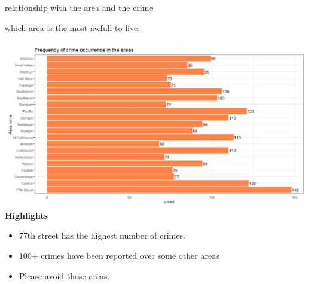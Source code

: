\documentclass{beamer}\usepackage[]{graphicx}\usepackage[]{xcolor}
\makeatletter
\def\maxwidth{ %
  \ifdim\Gin@nat@width>\linewidth
    \linewidth
  \else
    \Gin@nat@width
  \fi
}
\newenvironment{knitrout}{}{} %
\makeatother
\begin{document}
\begin{frame}[fragile]{relationship with the area and the crime}

which area is the most awfull to live.

\begin{knitrout}
\color{fgcolor}
\includegraphics[width=\maxwidth]{figure/place.png} 
\end{knitrout}
\textbf{Highlights}
\begin{itemize}
\item 77th street has the highest number of crimes.
\item 100+ crimes have been reported over some other areas
\item Please avoid those areas.

\end{itemize}
\end{frame}
\end{document}
